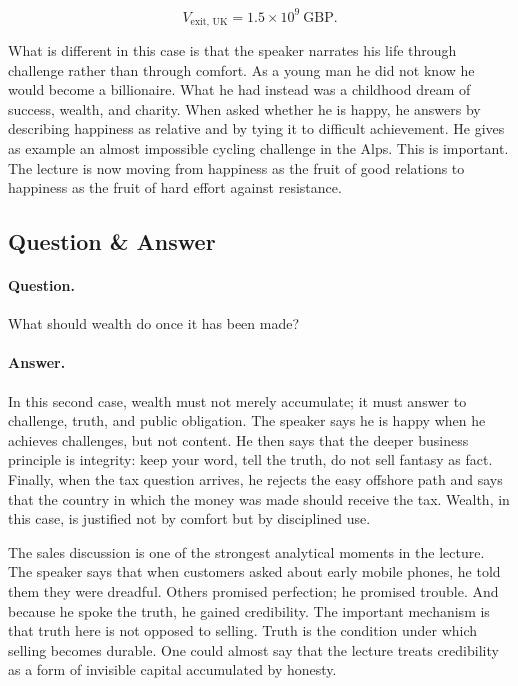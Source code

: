 \begin{equation}
V_{\text{exit, UK}} = 1.5 \times 10^{9}\ \mathrm{GBP}.
\end{equation}

What is different in this case is that the speaker narrates his life through challenge rather than through comfort. As a young man he did not know he would become a billionaire. What he had instead was a childhood dream of success, wealth, and charity. When asked whether he is happy, he answers by describing happiness as relative and by tying it to difficult achievement. He gives as example an almost impossible cycling challenge in the Alps. This is important. The lecture is now moving from happiness as the fruit of good relations to happiness as the fruit of hard effort against resistance.

\subsection{Question \& Answer}

\paragraph{Question.} What should wealth do once it has been made?

\paragraph{Answer.} In this second case, wealth must not merely accumulate; it must answer to challenge, truth, and public obligation. The speaker says he is happy when he achieves challenges, but not content. He then says that the deeper business principle is integrity: keep your word, tell the truth, do not sell fantasy as fact. Finally, when the tax question arrives, he rejects the easy offshore path and says that the country in which the money was made should receive the tax. Wealth, in this case, is justified not by comfort but by disciplined use.

The sales discussion is one of the strongest analytical moments in the lecture. The speaker says that when customers asked about early mobile phones, he told them they were dreadful. Others promised perfection; he promised trouble. And because he spoke the truth, he gained credibility. The important mechanism is that truth here is not opposed to selling. Truth is the condition under which selling becomes durable. One could almost say that the lecture treats credibility as a form of invisible capital accumulated by honesty.

